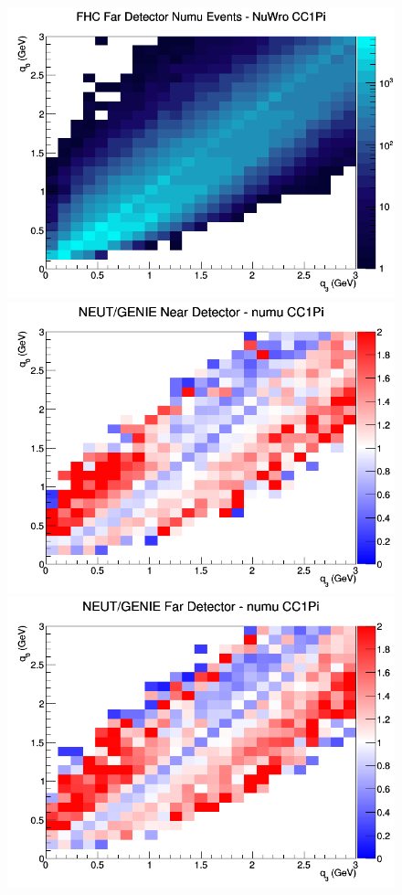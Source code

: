 \begin{figure}[h]
\endminipage
{}
\includegraphics[width=\linewidth]{eff_q0_q3/GAr/CC1Pi_FHC_FD_numu_q3_q0_NuWro.png}
\endminipage
\newline
{}
\includegraphics[width=\linewidth]{eff_q0_q3/GAr/ratios/CC1Pi_NEUT_GENIE_numu_near_q3_q0.png}
\endminipage
{}
\includegraphics[width=\linewidth]{eff_q0_q3/GAr/ratios/CC1Pi_NEUT_GENIE_numu_far_q3_q0.png}

\end{figure}
